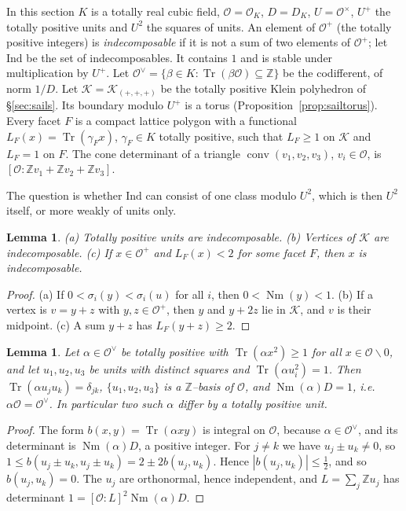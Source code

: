 \documentclass[11pt,reqno]{amsart}
\theoremstyle{plain}
\newtheorem{lemma}[theorem]{Lemma}
\theoremstyle{definition}
\newcommand{\Z}{\mathbb{Z}}
\newcommand{\Nm}{\operatorname{Nm}}
\newcommand{\Tr}{\operatorname{Tr}}
\newcommand{\conv}{\operatorname{conv}}
\begin{document}
In this section $K$ is a totally real cubic field, $\mathcal O=\mathcal O_K$, $D=D_K$, $U=\mathcal O^\times$,
$U^+$ the totally positive units and $U^2$ the squares of units. An element of $\mathcal O^+$ (the totally
positive integers) is \emph{indecomposable} if it is not a sum of two elements of $\mathcal O^+$; let $\mathrm{Ind}$
be the set of indecomposables. It contains $1$ and is stable under multiplication by $U^+$. Let
$\mathcal O^\vee=\{\beta\in K:\Tr(\beta\mathcal O)\subseteq\Z\}$ be the codifferent, of norm $1/D$. Let
$\mathcal K=\mathcal K_{(+,+,+)}$ be the totally positive Klein polyhedron of \S\ref{sec:sails}. Its boundary
modulo $U^+$ is a torus (Proposition~\ref{prop:sailtorus}). Every facet $F$ is a compact lattice polygon with a
functional $L_F(x)=\Tr(\gamma_Fx)$, $\gamma_F\in K$ totally positive, such that $L_F\ge1$ on $\mathcal K$ and
$L_F=1$ on $F$. The cone determinant of a triangle $\conv(v_1,v_2,v_3)$, $v_i\in\mathcal O$, is
$[\mathcal O:\Z v_1+\Z v_2+\Z v_3]$.

The question is whether $\mathrm{Ind}$ can consist of one class modulo $U^2$, which is then $U^2$ itself, or more
weakly of units only.

\begin{lemma}\label{lem:indecfacts}
\textup{(a)} Totally positive units are indecomposable. \textup{(b)} Vertices of $\mathcal K$ are indecomposable.
\textup{(c)} If $x\in\mathcal O^+$ and $L_F(x)<2$ for some facet $F$, then $x$ is indecomposable.
\end{lemma}

\begin{proof}
(a) If $0<\sigma_i(y)<\sigma_i(u)$ for all $i$, then $0<\Nm(y)<1$. (b) If a vertex is $v=y+z$ with
$y,z\in\mathcal O^+$, then $y$ and $y+2z$ lie in $\mathcal K$, and $v$ is their midpoint. (c) A sum $y+z$ has
$L_F(y+z)\ge2$.
\end{proof}

\begin{lemma}\label{lem:intform}
Let $\alpha\in\mathcal O^\vee$ be totally positive with $\Tr(\alpha x^2)\ge1$ for all $x\in\mathcal O\smallsetminus0$, and
let $u_1,u_2,u_3$ be units with distinct squares and $\Tr(\alpha u_i^2)=1$. Then $\Tr(\alpha u_ju_k)=\delta_{jk}$,
$\{u_1,u_2,u_3\}$ is a $\Z$--basis of $\mathcal O$, and $\Nm(\alpha)D=1$, i.e.\ $\alpha\mathcal O=\mathcal O^\vee$. In
particular two such $\alpha$ differ by a totally positive unit.
\end{lemma}

\begin{proof}
The form $b(x,y)=\Tr(\alpha xy)$ is integral on $\mathcal O$, because $\alpha\in\mathcal O^\vee$, and its
determinant is $\Nm(\alpha)D$, a positive integer. For $j\ne k$ we have $u_j\pm u_k\ne0$, so
$1\le b(u_j\pm u_k,u_j\pm u_k)=2\pm2b(u_j,u_k)$. Hence $|b(u_j,u_k)|\le\tfrac12$, and so $b(u_j,u_k)=0$. The
$u_j$ are orthonormal, hence independent, and $L=\sum_j\Z u_j$ has determinant $1=[\mathcal O:L]^2\Nm(\alpha)D$.
\end{proof}
\end{document}
